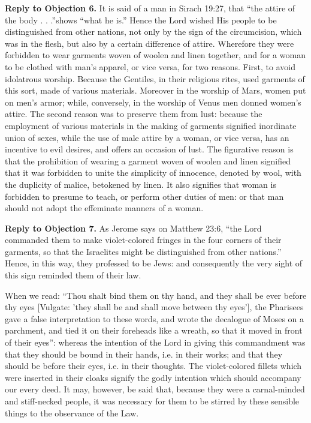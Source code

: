 \textbf{Reply to Objection 6.} It is said of a man in Sirach 19:27, that ``the attire of the body . . .''shows ``what he is.'' Hence the Lord wished His people to be distinguished from other nations, not only by the sign of the circumcision, which was in the flesh, but also by a certain difference of attire. Wherefore they were forbidden to wear garments woven of woolen and linen together, and for a woman to be clothed with man's apparel, or vice versa, for two reasons. First, to avoid idolatrous worship. Because the Gentiles, in their religious rites, used garments of this sort, made of various materials. Moreover in the worship of Mars, women put on men's armor; while, conversely, in the worship of Venus men donned women's attire. The second reason was to preserve them from lust: because the employment of various materials in the making of garments signified inordinate union of sexes, while the use of male attire by a woman, or vice versa, has an incentive to evil desires, and offers an occasion of lust. The figurative reason is that the prohibition of wearing a garment woven of woolen and linen signified that it was forbidden to unite the simplicity of innocence, denoted by wool, with the duplicity of malice, betokened by linen. It also signifies that woman is forbidden to presume to teach, or perform other duties of men: or that man should not adopt the effeminate manners of a woman.

\textbf{Reply to Objection 7.} As Jerome says on Matthew 23:6, ``the Lord commanded them to make violet-colored fringes in the four corners of their garments, so that the Israelites might be distinguished from other nations.'' Hence, in this way, they professed to be Jews: and consequently the very sight of this sign reminded them of their law.

When we read: ``Thou shalt bind them on thy hand, and they shall be ever before thy eyes [Vulgate: 'they shall be and shall move between thy eyes'], the Pharisees gave a false interpretation to these words, and wrote the decalogue of Moses on a parchment, and tied it on their foreheads like a wreath, so that it moved in front of their eyes'': whereas the intention of the Lord in giving this commandment was that they should be bound in their hands, i.e. in their works; and that they should be before their eyes, i.e. in their thoughts. The violet-colored fillets which were inserted in their cloaks signify the godly intention which should accompany our every deed. It may, however, be said that, because they were a carnal-minded and stiff-necked people, it was necessary for them to be stirred by these sensible things to the observance of the Law.


